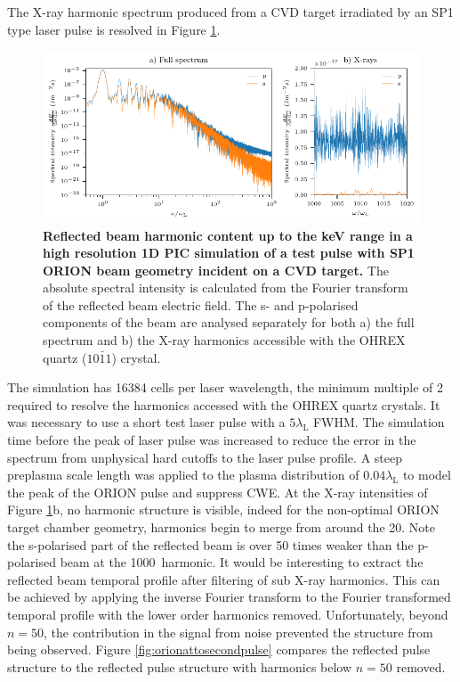 The X-ray harmonic spectrum produced from a CVD target irradiated by an SP1 type laser pulse is resolved in Figure \ref{fig:orionxrayharmonics}.
\begin{figure}
	\centering
	\includegraphics{figures/orion/orion_xray_harmonics}
	\caption[Reflected beam harmonic content up to the keV range in a high resolution 1D PIC simulation.]{\textbf{Reflected beam harmonic content up to the keV range in a high resolution 1D PIC simulation of a test pulse with SP1 ORION beam geometry incident on a CVD target.} The absolute spectral intensity is calculated from the Fourier transform of the reflected beam electric field. The s- and p-polarised components of the beam are analysed separately for both a) the full spectrum and b) the X-ray harmonics accessible with the OHREX quartz ($10\bar{1}1$) crystal.}
	\label{fig:orionxrayharmonics}
\end{figure}
The simulation has 16384 cells per laser wavelength, the minimum multiple of 2 required to resolve the harmonics accessed with the OHREX quartz crystals. It was necessary to use a short test laser pulse with a $5\lambda_\mathrm{L}$ FWHM. The simulation time before the peak of laser pulse was increased to reduce the error in the spectrum from unphysical hard cutoffs to the laser pulse profile. A steep preplasma scale length was applied to the plasma distribution of $0.04\lambda_\mathrm{L}$ to model the peak of the ORION pulse and suppress \ac{CWE}. At the X-ray intensities of Figure \ref{fig:orionxrayharmonics}b, no harmonic structure is visible, indeed for the non-optimal ORION target chamber geometry, harmonics begin to merge from around the 20\th . Note the s-polarised part of the reflected beam is over 50 times weaker than the p-polarised beam at the 1000\th\ harmonic.
It would be interesting to extract the reflected beam temporal profile after filtering of sub X-ray harmonics. This can be achieved by applying the inverse Fourier transform to the Fourier transformed temporal profile with the lower order harmonics removed. Unfortunately, beyond $n=50$, the contribution in the signal from noise prevented the structure from being observed. Figure \ref{fig:orionattosecondpulse} compares the reflected pulse structure to the reflected pulse structure with harmonics below $n = 50$ removed. 
